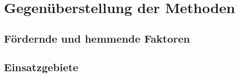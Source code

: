 \chapter{Gegenüberstellung der Methoden}
\label{cha:Vergleich}


\section{Fördernde und hemmende Faktoren}

\section{Einsatzgebiete}



